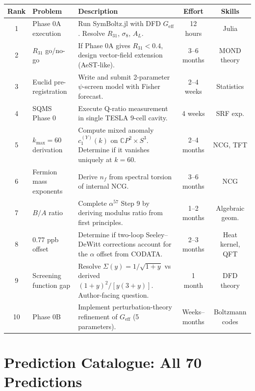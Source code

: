 \documentclass[11pt,a4paper]{article}
\newcommand{\CP}{\mathbb{C}P}
\begin{document}
\begin{center}
\begin{longtable}{clp{5cm}cc}
\toprule
\textbf{Rank} & \textbf{Problem} & \textbf{Description} & \textbf{Effort} & \textbf{Skills} \\
\midrule
\endfirsthead
1 & Phase 0A execution & Run SymBoltz.jl with DFD $G_\text{eff}$. Resolve $R_{31}$, $\sigma_8$, $A_L$. & 12 hours & Julia \\
2 & $R_{31}$ go/no-go & If Phase 0A gives $R_{31} < 0.4$, design vector-field extension (AeST-like). & 3--6 months & MOND theory \\
3 & Euclid pre-registration & Write and submit 2-parameter $\psi$-screen model with Fisher forecast. & 2--4 weeks & Statistics \\
4 & SQMS Phase 0 & Execute Q-ratio measurement in single TESLA 9-cell cavity. & 4 weeks & SRF exp. \\
5 & $k_{\max} = 60$ derivation & Compute mixed anomaly $c_1^{(Y)}(k)$ on $\CP^2 \times S^3$. Determine if it vanishes uniquely at $k = 60$. & 2--4 months & NCG, TFT \\
6 & Fermion mass exponents & Derive $n_f$ from spectral torsion of internal NCG. & 3--6 months & NCG \\
7 & $B/A$ ratio & Complete $\alpha^{57}$ Step 9 by deriving modulus ratio from first principles. & 1--2 months & Algebraic geom. \\
8 & 0.77 ppb offset & Determine if two-loop Seeley--DeWitt corrections account for the $\alpha$ offset from CODATA. & 2--3 months & Heat kernel, QFT \\
9 & Screening function gap & Resolve $\Sigma(y) = 1/\sqrt{1+y}$ vs derived $(1+y)^2/[y(3+y)]$. Author-facing question. & 1 month & DFD theory \\
10 & Phase 0B & Implement perturbation-theory refinement of $G_\text{eff}$ (5 parameters). & Weeks--months & Boltzmann codes \\
\bottomrule
\end{longtable}
\end{center}


\part{Prediction Catalogue: All 70 Predictions}
\label{part:predictions}
\end{document}

